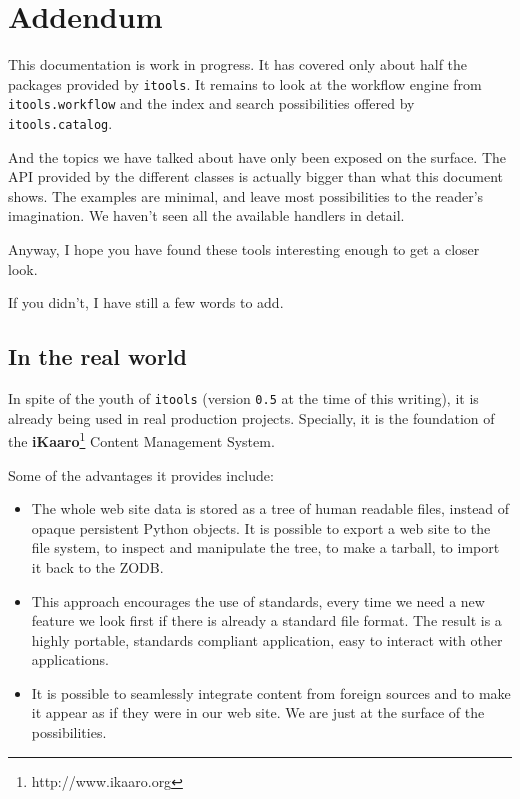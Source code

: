 \chapter{Addendum}

This documentation is work in progress. It has covered only about half the
packages provided by {\tt itools}. It remains to look at the workflow engine
from {\tt itools.workflow} and the index and search possibilities offered by
{\tt itools.catalog}.

And the topics we have talked about have only been exposed on the surface.
The API provided by the different classes is actually bigger than what this
document shows. The examples are minimal, and leave most possibilities to
the reader's imagination. We haven't seen all the available handlers in detail.

Anyway, I hope you have found these tools interesting enough to get a closer
look.

If you didn't, I have still a few words to add.


\section{In the real world}

In spite of the youth of {\tt itools} (version {\tt 0.5} at the time of this
writing), it is already being used in real production projects. Specially,
it is the foundation of the {\bf iKaaro}\footnote{http://www.ikaaro.org}
Content Management System.

Some of the advantages it provides include:

\begin{itemize}
  \item The whole web site data is stored as a tree of human readable
    files, instead of opaque persistent Python objects. It is possible
    to export a web site to the file system, to inspect and manipulate
    the tree, to make a tarball, to import it back to the ZODB.

  \item This approach encourages the use of standards, every time we
    need a new feature we look first if there is already a standard
    file format. The result is a highly portable, standards compliant
    application, easy to interact with other applications.

  \item It is possible to seamlessly integrate content from foreign
    sources and to make it appear as if they were in our web site.
    We are just at the surface of the possibilities.
\end{itemize}

